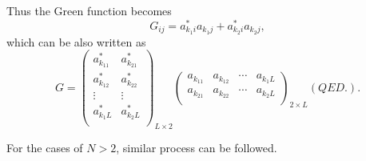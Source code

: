\documentclass[prb,superscriptaddress,letter,10pt,onecolumn]{revtex4}
\begin{document}
Thus the Green function becomes
\begin{equation}
	G_{ij} = a_{k_1i}^* a_{k_1j} + a_{k_2i}^* a_{k_2j},
\end{equation}
which can be also written as
\begin{equation}
	G = 
	\left(                 	
	\begin{array}{cc}   		
		a_{k_11}^* & a_{k_21}^* \\  		
		a_{k_12}^* & a_{k_22}^* \\
		\vdots & \vdots \\
		a_{k_1L}^* & a_{k_2L}^* \\  		
	\end{array}	
	\right)_{L\times 2}
	\left( 
	\begin{array}{cccc}   		
		a_{k_11} & a_{k_12} & \cdots & a_{k_1L}\\  		
		a_{k_21} & a_{k_22} & \cdots & a_{k_2L}\\	
	\end{array}	
	\right)_{2\times L}
	(QED.).
\end{equation}

For the cases of $N>2$, similar process can be followed.

%
%




\onecolumngrid
\end{document}
